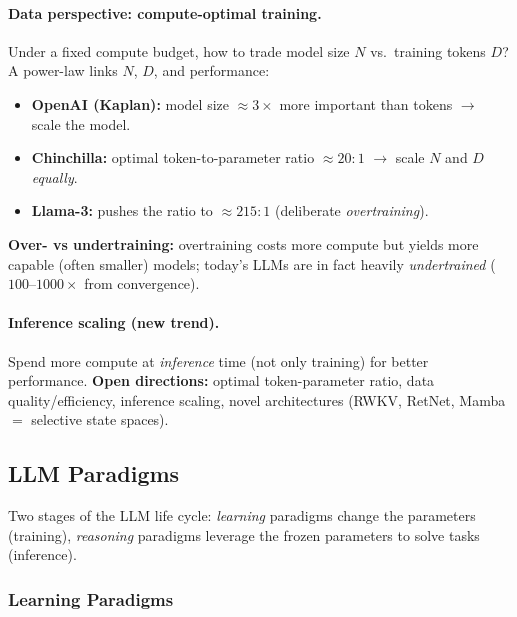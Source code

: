 \documentclass{article}
\begin{document}
\paragraph{Data perspective: compute-optimal training.} Under a fixed compute budget, how to trade model size $N$ vs.\ training tokens $D$? A power-law links $N$, $D$, and performance:
\begin{itemize}
    \item \textbf{OpenAI (Kaplan):} model size $\approx 3\times$ more important than tokens $\rightarrow$ scale the model.
    \item \textbf{Chinchilla:} optimal token-to-parameter ratio $\approx 20{:}1$ $\rightarrow$ scale $N$ and $D$ \textit{equally}.
    \item \textbf{Llama-3:} pushes the ratio to $\approx 215{:}1$ (deliberate \textit{overtraining}).
\end{itemize}
\textbf{Over- vs undertraining:} overtraining costs more compute but yields more capable (often smaller) models; today's LLMs are in fact heavily \textit{undertrained} ($100$--$1000\times$ from convergence).

\paragraph{Inference scaling (new trend).} Spend more compute at \textit{inference} time (not only training) for better performance. \textbf{Open directions:} optimal token-parameter ratio, data quality/efficiency, inference scaling, novel architectures (RWKV, RetNet, Mamba $=$ selective state spaces).

\subsection{LLM Paradigms}
Two stages of the LLM life cycle: \textit{learning} paradigms change the parameters (training), \textit{reasoning} paradigms leverage the frozen parameters to solve tasks (inference).

\subsubsection{Learning Paradigms}
\end{document}
